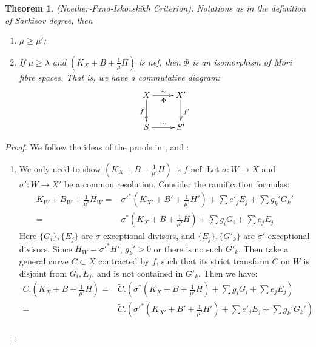 \documentclass[11pt]{amsart}
\newtheorem{thm}[defn]{Theorem}
\begin{document}
\begin{thm}\label{nfi}
  (Noether-Fano-Iskovskikh Criterion): Notations as in the definition of Sarkisov degree, then
  \begin{enumerate}
    \item $ \mu\geqslant \mu' $;
    \item If $ \mu \geqslant \lambda $ and $ (K_X+B+\frac{1}{\mu} H) $ is nef, then $\Phi$ is an isomorphism of Mori fibre spaces. That is, we have a commutative diagram:
          \[ \xymatrix{
              X\ar[r]^\sim_\Phi\ar[d]_f&X'\ar[d]^{f'}\\
              S\ar[r]^\sim& S' } \]
  \end{enumerate}
\end{thm}

\begin{proof}
  We follow the ideas of the proofs in \cite[Claim 13.20]{haconMinimalModelProgram2012}, \cite[Theorem 5.1]{liuSarkisovProgramGeneralized2021} and \cite[Theorem 4.2]{cortiFactoringBirationalMaps}:
  \begin{enumerate}
    \item We only need to show $ (K_X+B+\frac{1}{\mu'}H) $ is $ f $-nef.   Let $\sigma:W\to X$ and $\sigma':W\to X'$ be a common resolution. Consider the ramification formulas:
          \[
            \begin{aligned}
              K_W+B_W+\frac{1}{\mu'}H_W= & \sigma'^*(K_{X'}+B'+\frac{1}{\mu'}H')+\sum e'_jE_j+ \sum g_k'G_k' \\
              =                          & \sigma^*(K_{X}+B+\frac{1}{\mu'}H)+\sum g_iG_i+\sum e_jE_j
            \end{aligned}
          \]
          Here $ \{G_i\}, \{E_j\} $ are $ \sigma $-exceptional divisors, and $ \{E_j\}, \{G'_k\} $ are $ \sigma' $-exceptional divisors. Since $H_W=\sigma'^*H' $, $ g_k'>0 $ or there is no such $ G'_k $. Then take a general curve $ C\subset X $ contracted by $ f $, such that its strict transform $ \tilde{C} $ on $ W $ is disjoint from $ G_i, E_j $, and is not contained in $ G'_k $. Then we have:
          \[
            \begin{aligned}
              C.\left(K_X+B+\frac{1}{\mu'}H\right)= & \tilde{C}.\left(\sigma^*\left(K_X+B+\frac{1}{\mu'}H\right)+\sum g_iG_i+\sum e_jE_j\right)           \\
              =                                     & \tilde{C}.\left(\sigma'^*\left(K_{X'}+B'+\frac{1}{\mu'}H'\right)+\sum e'_jE_j+ \sum g_k'G_k'\right) \\

\end{aligned}\]
\end{enumerate}
\end{proof}
\end{document}
